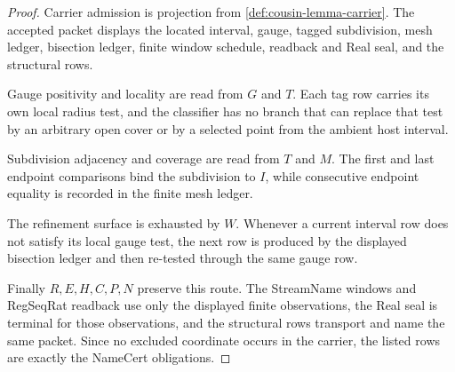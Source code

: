 \begin{proof}
Carrier admission is projection from \autoref{def:cousin-lemma-carrier}. The accepted packet displays the located interval, gauge, tagged subdivision, mesh ledger, bisection ledger, finite window schedule, readback and Real seal, and the structural rows.

Gauge positivity and locality are read from $G$ and $T$. Each tag row carries its own local radius test, and the classifier has no branch that can replace that test by an arbitrary open cover or by a selected point from the ambient host interval.

Subdivision adjacency and coverage are read from $T$ and $M$. The first and last endpoint comparisons bind the subdivision to $I$, while consecutive endpoint equality is recorded in the finite mesh ledger.

The refinement surface is exhausted by $W$. Whenever a current interval row does not satisfy its local gauge test, the next row is produced by the displayed bisection ledger and then re-tested through the same gauge row.

Finally $R,E,H,C,P,N$ preserve this route. The StreamName windows and RegSeqRat readback use only the displayed finite observations, the Real seal is terminal for those observations, and the structural rows transport and name the same packet. Since no excluded coordinate occurs in the carrier, the listed rows are exactly the NameCert obligations.
\end{proof}

